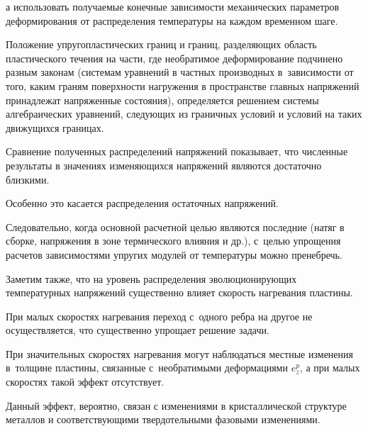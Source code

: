 а использовать получаемые конечные зависимости механических параметров деформирования от распределения температуры на каждом временном шаге.



Положение упругопластических границ и границ, разделяющих область пластического течения на части, где необратимое деформирование подчинено разным законам (системам уравнений в частных производных в~зависимости от того, каким граням поверхности нагружения в пространстве главных напряжений принадлежат напряженные состояния), определяется решением системы алгебраических уравнений, следующих из граничных условий и условий на таких движущихся границах. 



Сравнение полученных распределений напряжений показывает, что численные результаты в значениях изменяющихся напряжений являются достаточно близкими. 

Особенно это касается распределения остаточных напряжений. 

Следовательно, когда основной расчетной целью являются последние (натяг в сборке, напряжения в зоне термического влияния и др.), с~целью упрощения расчетов зависимостями упругих модулей от температуры можно пренебречь.



Заметим также, что на уровень распределения эволюционирующих температурных напряжений существенно влияет скорость нагревания пластины. 

При малых скоростях нагревания переход с~одного ребра на другое не осуществляется, что существенно упрощает  решение задачи. 

При значительных скоростях нагревания могут наблюдаться местные изменения в~толщине пластины, связанные с~необратимыми деформациями $e_{z}^{p} $, а при малых скоростях такой эффект отсутствует. 

Данный эффект, вероятно, связан с изменениями в кристаллической структуре металлов и соответствующими твердотельными фазовыми изменениями.







